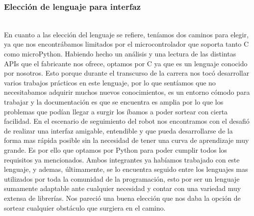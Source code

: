 \subsubsection{Elección de lenguaje para interfaz} \mbox{} \vspace{10pt} \\
En cuanto a las elección del lenguaje se refiere, teníamos dos caminos para elegir, ya que nos encontrábamos limitados por el microcontrolador que soporta tanto C como microPython. Habiendo hecho un análisis y una lectura de las distintas APIs que el fabricante nos ofrece, optamos por C ya que es un lenguaje conocido por nosotros. Esto porque durante el transcurso de la carrera nos tocó desarrollar varios trabajos prácticos en este lenguaje, por lo que sentíamos que no necesitabamos adquirir muchos nuevos conocimientos, es un entorno cómodo para trabajar y la documentación es que se encuentra es amplia por lo que los problemas que podían llegar a surgir los íbamos a poder sortear con cierta facilidad.
En el escenario de seguimiento del robot nos encontramos con el desafió de realizar una interfaz amigable, entendible y que pueda desarrollarse de la forma mas rápida posible sin la necesidad de tener una curva de aprendizaje muy grande. Es por ello que optamos por Python para poder cumplir todos los requisitos ya mencionados. Ambos integrantes ya habíamos trabajado con este lenguaje, y ademas, últimamente, se lo encuentra seguido entre los lenguajes mas utilizados por toda la comunidad de la programación, esto por ser un lenguaje sumamente adaptable ante cualquier necesidad y contar con una variedad muy extensa de librerías. Nos pareció una buena elección que nos daba la opción de sortear cualquier obstáculo que surgiera en el camino.